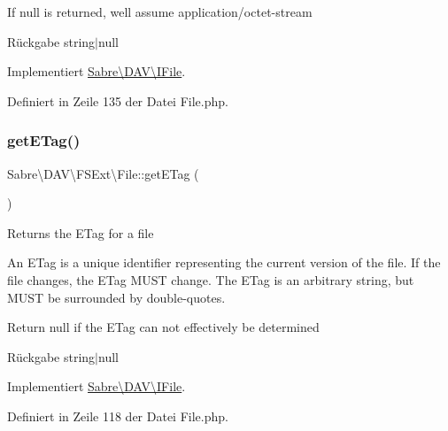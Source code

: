 If null is returned, we\textquotesingle{}ll assume application/octet-\/stream

\begin{DoxyReturn}{Rückgabe}
string$\vert$null 
\end{DoxyReturn}


Implementiert \mbox{\hyperlink{interface_sabre_1_1_d_a_v_1_1_i_file_aa76147e3e0ad228026dcb03035b499bc}{Sabre\textbackslash{}\+D\+A\+V\textbackslash{}\+I\+File}}.



Definiert in Zeile 135 der Datei File.\+php.

\mbox{\label{class_sabre_1_1_d_a_v_1_1_f_s_ext_1_1_file_a9230f17550bcc13aac15429e356280e1}} 
\subsubsection{\texorpdfstring{get\+E\+Tag()}{getETag()}}
{\footnotesize\ttfamily Sabre\textbackslash{}\+D\+A\+V\textbackslash{}\+F\+S\+Ext\textbackslash{}\+File\+::get\+E\+Tag (\begin{DoxyParamCaption}{ }\end{DoxyParamCaption})}

Returns the E\+Tag for a file

An E\+Tag is a unique identifier representing the current version of the file. If the file changes, the E\+Tag M\+U\+ST change. The E\+Tag is an arbitrary string, but M\+U\+ST be surrounded by double-\/quotes.

Return null if the E\+Tag can not effectively be determined

\begin{DoxyReturn}{Rückgabe}
string$\vert$null 
\end{DoxyReturn}


Implementiert \mbox{\hyperlink{interface_sabre_1_1_d_a_v_1_1_i_file_a2b207a6037dcbd4e7373b977dc60117f}{Sabre\textbackslash{}\+D\+A\+V\textbackslash{}\+I\+File}}.



Definiert in Zeile 118 der Datei File.\+php.

\mbox{\label{class_sabre_1_1_d_a_v_1_1_f_s_ext_1_1_file_aec3768804d387a073610838d89bff5c9}} 
